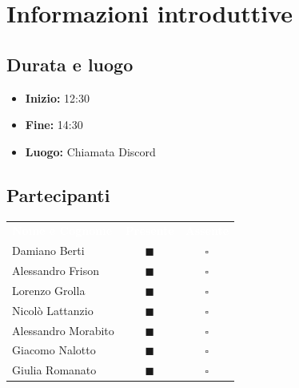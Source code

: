 \documentclass[a4paper, 11pt]{article}
\begin{document}

\section{Informazioni introduttive}

\subsection{Durata e luogo}
\begin{itemize}
    \item \textbf{Inizio:} 12:30
    \item \textbf{Fine:} 14:30
    \item \textbf{Luogo:} Chiamata Discord
\end{itemize}

\subsection{Partecipanti}
\begin{center}
    \begin{tabular}{>{\raggedright\arraybackslash}p{6cm} c c}
        \rowcolor{AccentColor}
        \textcolor{white}{\textbf{Nome e Cognome}} & 
        \textcolor{white}{\textbf{Presente}} & 
        \textcolor{white}{\textbf{Assente}} \\
        
        Damiano Berti     & \textcolor{AccentColor}{$\blacksquare$}    & $\square$        \\
        Alessandro Frison     & \textcolor{AccentColor}{$\blacksquare$}    & $\square$        \\
        Lorenzo Grolla     & \textcolor{AccentColor}{$\blacksquare$}    & $\square$        \\
        Nicolò Lattanzio    & \textcolor{AccentColor}{$\blacksquare$}    & $\square$        \\
        Alessandro Morabito   & \textcolor{AccentColor}{$\blacksquare$}    & $\square$        \\
        Giacomo Nalotto   & \textcolor{AccentColor}{$\blacksquare$}    & $\square$        \\
        Giulia Romanato   & \textcolor{AccentColor}{$\blacksquare$}    & $\square$        \\
    \end{tabular}
\end{center}
\end{document}
